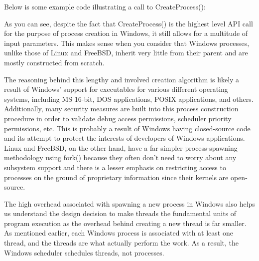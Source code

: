 \documentclass[onecolumn, draftclsnofoot,10pt, compsoc]{IEEEtran}
\begin{document}
Below is some example code illustrating a call to CreateProcess():

As you can see, despite the fact that CreateProcess() is the highest level API call for the purpose of process creation in Windows, it still allows for a multitude of input parameters. This makes sense when you consider that Windows processes, unlike those of Linux and FreeBSD, inherit very little from their parent and are mostly constructed from scratch.

The reasoning behind this lengthy and involved creation algorithm is likely a result of Windows' support for executables for various different operating systems, including MS 16-bit, DOS applications, POSIX applications, and others. Additionally, many security measures are built into this process construction procedure in order to validate debug access permissions, scheduler priority permissions, etc. This is probably a result of Windows having closed-source code and its attempt to protect the interests of developers of Windows applications. Linux and FreeBSD, on the other hand, have a far simpler process-spawning methodology using fork() because they often don't need to worry about any subsystem support and there is a lesser emphasis on restricting access to processes on the ground of proprietary information since their kernels are open-source.

The high overhead associated with spawning a new process in Windows also helps us understand the design decision to make threads the fundamental units of program execution as the overhead behind creating a new thread is far smaller.  As mentioned earlier, each Windows process is associated with at least one thread, and the threads are what actually perform the work. As a result, the Windows scheduler schedules threads, not processes. 
\end{document}
